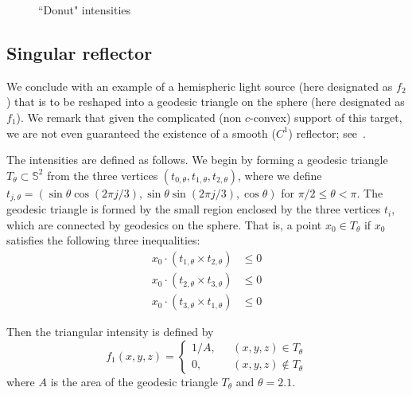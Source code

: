 \documentclass{amsart}
\newcommand{\Sf}{\mathbb{S}^{2}}
\theoremstyle{lemma}
\theoremstyle{remark}
\begin{document}
\begin{figure}
	\caption{``Donut" intensities}\label{fig:donutresult}
\end{figure}


\subsection{Singular reflector}
We conclude with an example of a hemispheric light source (here designated as $f_2$) that is to be reshaped into a geodesic triangle on the sphere (here designated as $f_1$).  We remark that given the complicated (non $c$-convex) support of this target, we are not even guaranteed the existence of a smooth ($C^1$) reflector; see~\cite{Loeper_OTonSphere}. 

The intensities are defined as follows.  We begin by forming a geodesic triangle $T_{\theta} \subset \Sf$ from the three vertices $(t_{0, \theta}, t_{1, \theta}, t_{2, \theta})$, where we define $t_{j, \theta} = \left( \sin \theta \cos (2\pi j/3), \sin \theta \sin (2\pi j/3), \cos \theta \right)$ for $\pi/2\leq \theta <\pi$. The geodesic triangle is formed by the small region enclosed by the three vertices $t_i$, which are connected by geodesics on the sphere. That is, a point $x_0 \in T_{\theta}$ if $x_0$ satisfies the following three inequalities:
\begin{align*}
x_0 \cdot \left( t_{1,\theta} \times t_{2,\theta} \right) &\leq 0 \\
x_0 \cdot \left( t_{2,\theta} \times t_{3,\theta} \right) &\leq 0 \\
x_0 \cdot \left( t_{3,\theta} \times t_{1,\theta} \right) &\leq 0
\end{align*}

Then the triangular intensity is defined by
\begin{equation}
f_1(x,y,z) = 
\begin{cases}
1/A , \ \ \ &(x,y,z) \in T_{\theta} \\
0, &(x,y,z) \notin T_{\theta}
\end{cases}
\end{equation}
where $A$ is the area of the geodesic triangle $T_{\theta}$ and $\theta = 2.1$.
\end{document}
